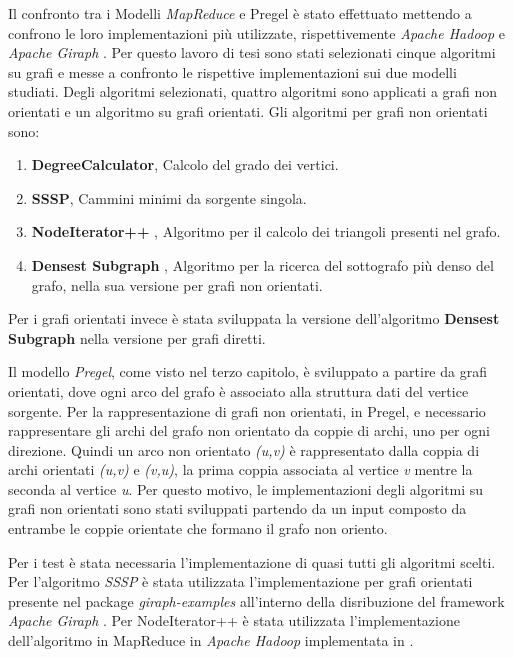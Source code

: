 \documentclass[LaM,binding=0.6cm]{sapthesis}
\begin{document}
Il confronto tra i Modelli \textit{MapReduce} \cite{Dean:2008:MSD:1327452.1327492} e Pregel \cite{Malewicz:2010:PSL:1807167.1807184} è stato effettuato mettendo a confrono le loro implementazioni più utilizzate, rispettivemente \textit{Apache Hadoop} \cite{1_hadoop.apache.org_2015}e \textit{Apache Giraph} \cite{4_giraph.apache.org_2015}.
Per questo lavoro di tesi sono stati selezionati cinque algoritmi su grafi e messe a confronto le rispettive implementazioni sui due modelli studiati. Degli algoritmi selezionati, quattro algoritmi sono applicati a grafi non orientati e un algoritmo su grafi orientati. Gli algoritmi per grafi non orientati sono:
\begin{enumerate}
\item \textbf{DegreeCalculator}, Calcolo del grado dei vertici.
\item \textbf{SSSP}, Cammini minimi da sorgente singola.
\item \textbf{NodeIterator++} \cite{Suri:2011:CTC:1963405.1963491} , Algoritmo per il calcolo dei triangoli presenti nel grafo.
\item \textbf{Densest Subgraph} \cite{DBLP:journals/corr/abs-1201-6567}, Algoritmo per la ricerca del sottografo più denso del grafo, nella sua versione per grafi non orientati.
\end{enumerate}

Per i grafi orientati invece è stata sviluppata la versione dell'algoritmo \textbf{Densest Subgraph} \cite{DBLP:journals/corr/abs-1201-6567} nella versione per grafi diretti.

Il modello \textit{Pregel}, come visto nel terzo capitolo, è sviluppato a partire da grafi orientati, dove ogni arco del grafo è associato alla struttura dati del vertice sorgente. Per la rappresentazione di grafi non orientati, in Pregel, e necessario rappresentare gli archi del grafo non orientato da coppie di archi, uno per ogni direzione. Quindi un arco non orientato \textit{(u,v)} è rappresentato dalla coppia di archi orientati \textit{(u,v) }e \textit{(v,u)}, la prima coppia associata al vertice \textit{v} mentre la seconda al vertice \textit{u}.
Per questo motivo, le implementazioni degli algoritmi su grafi non orientati sono stati sviluppati partendo da un input composto da entrambe le coppie orientate che formano il grafo non oriento.

Per i test è stata necessaria l'implementazione di quasi tutti gli algoritmi scelti. Per l'algoritmo \textit{SSSP} è stata utilizzata l'implementazione per grafi orientati presente nel package \textit{giraph-examples} all'interno della disribuzione del framework \textit{Apache Giraph} \cite{4_giraph.apache.org_2015}.
Per  NodeIterator++ è stata utilizzata l'implementazione dell'algoritmo in MapReduce in \textit{Apache Hadoop} \cite{1_hadoop.apache.org_2015} implementata in \cite{DBLP:journals/corr/FinocchiFF14}.
 
\end{document}
